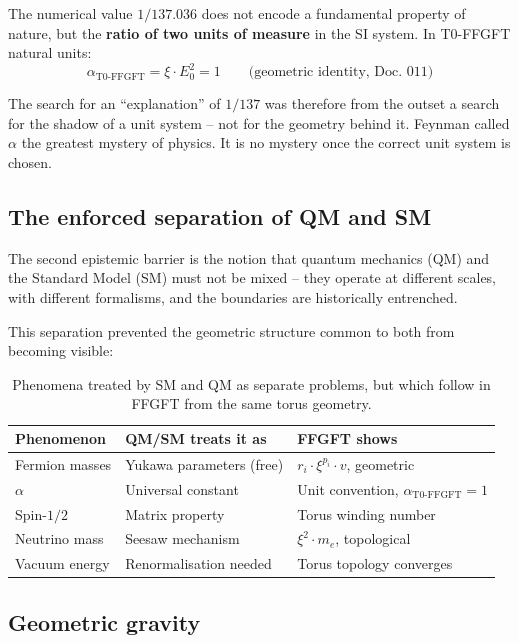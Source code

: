 The numerical value $1/137.036$ does not encode a fundamental property
of nature, but the \textbf{ratio of two units of measure} in the SI
system. In T0-FFGFT natural units:
\begin{equation}
    \alpha_{\text{T0-FFGFT}} = \xi \cdot E_0^2 = 1
    \qquad \text{(geometric identity, Doc.~011)}
\end{equation}

The search for an ``explanation'' of $1/137$ was therefore from
the outset a search for the shadow of a unit system -- not for the
geometry behind it. Feynman called $\alpha$ the greatest mystery
of physics. It is no mystery once the correct unit system is chosen.

\subsection{The enforced separation of QM and SM}

The second epistemic barrier is the notion that quantum mechanics (QM)
and the Standard Model (SM) must not be mixed -- they operate at
different scales, with different formalisms, and the boundaries are
historically entrenched.

This separation prevented the geometric structure common to both from
becoming visible:

\begin{table}[htbp]
\centering\footnotesize
\begin{tabular}{lll}
\toprule
\textbf{Phenomenon} & \textbf{QM/SM treats it as} & \textbf{FFGFT shows} \\
\midrule
Fermion masses  & Yukawa parameters (free)  & $r_i \cdot \xi^{p_i} \cdot v$, geometric \\
$\alpha$        & Universal constant        & Unit convention, $\alpha_{\text{T0-FFGFT}}=1$ \\
Spin-$1/2$      & Matrix property           & Torus winding number \\
Neutrino mass   & Seesaw mechanism          & $\xi^2 \cdot m_e$, topological \\
Vacuum energy   & Renormalisation needed    & Torus topology converges \\
\bottomrule
\end{tabular}
\caption{Phenomena treated by SM and QM as separate problems,
but which follow in FFGFT from the same torus geometry.}
\label{tab:sm_qm_en}
\end{table}

\subsection{Geometric gravity}

